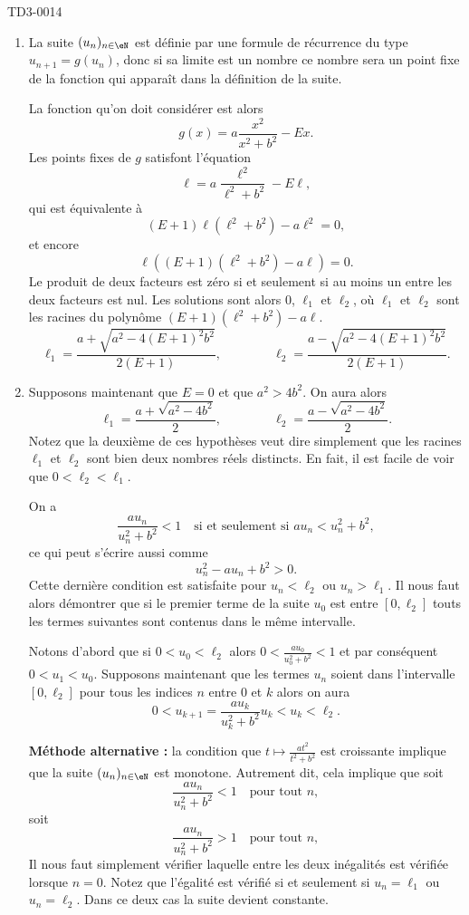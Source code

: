 
\begin{corrige}{TD3-0014}

  \begin{enumerate}
  \item La suite $(u_n)_{n\in\eN}$ est définie par une formule de récurrence du type $u_{n+1}=g(u_n)$, donc si sa limite est un nombre ce nombre sera un point fixe de la fonction qui appara\^{i}t dans la  définition de la suite. 

La fonction qu'on doit considérer est alors 
\[
g(x)= a\frac{x^2}{x^2+b^2}-Ex.
\] 
Les points fixes de $g$ satisfont l'équation
\[
\ell = a\frac{\ell^2}{\ell^2+b^2}-E\ell, 
\]
qui est équivalente à 
\[
(E+1)\ell (\ell^2+b^2)-a \ell^2 =0,
\]
et encore 
\[
\ell \left((E+1)(\ell^2+b^2)-a \ell\right)=0.
\]
Le produit de deux facteurs est zéro si et seulement si au moins un entre les deux facteurs est nul. Les solutions sont  alors $0$, $\ell_1$ et $\ell_2$, où $\ell_1 $ et $\ell_2$ sont les racines du polynôme $(E+1)(\ell^2+b^2)-a \ell$.
\[
\ell_1 =\frac{a+\sqrt{a^2-4(E+1)^2b^2}}{2(E+1)}, \qquad\qquad\ell_2 =\frac{a-\sqrt{a^2-4(E+1)^2b^2}}{2(E+1)}.
\]
\item       \label{Itemtzziqtrois}
    Supposons maintenant que $E=0$ et que $a^2>4b^2$. On aura alors 
\[
\ell_1 =\frac{a+\sqrt{a^2-4b^2}}{2}, \qquad\qquad\ell_2 =\frac{a-\sqrt{a^2-4b^2}}{2}.
\]
 Notez que la deuxième de ces hypothèses veut dire simplement que les racines $\ell_1$ et $\ell_2$ sont bien deux nombres réels distincts. En fait, il est facile de voir que $0<\ell_2<\ell_1$.  

On a  
\[
\frac{au_n}{u_n^2+b^2}< 1 \quad\textrm{si et seulement si } au_n< u_n^2+b^2, 
\]
ce qui peut s'écrire aussi comme
\[
u_n^2-au_n+b^2>0.
\]
Cette dernière condition est satisfaite pour $u_n< \ell_2$ ou $u_n> \ell_1$. Il nous faut alors démontrer que si le premier terme de la suite $u_0$ est entre $[0,\ell_2]$ touts les termes suivantes sont contenus dans le même intervalle.

Notons d'abord que si $0<u_0<\ell_2$ alors $\displaystyle 0<\frac{a u_0}{u_0^2+b^2}<1$ et par conséquent $0<u_1<u_0$. Supposons maintenant que les termes $u_n$ soient dans l'intervalle $[0,\ell_2]$ pour  tous les indices $n$ entre $0$ et $k$ alors on aura 
\[
0<u_{k+1}=\frac{au_k}{u_k^2+b^2} u_k< u_k<\ell_2.
\]

\noindent\textbf{Méthode alternative :} la condition que $t\mapsto  \frac{a t^2}{t^2+b^2}$ est croissante implique que la suite $(u_n)_{n\in\eN}$ est monotone. Autrement dit, cela implique que soit  
\[
\frac{au_n}{u_n^2+b^2}< 1 \quad\textrm{pour tout } n, 
\]
soit
\[
\frac{au_n}{u_n^2+b^2}> 1 \quad\textrm{pour tout } n, 
\]
Il nous faut simplement vérifier laquelle entre les deux inégalités est vérifiée lorsque $n=0$. Notez que l'égalité est vérifié si et seulement si $u_n=\ell_1$ ou $u_n=\ell_2$. Dans ce deux cas la suite devient constante. 


\end{enumerate}
\end{corrige}
